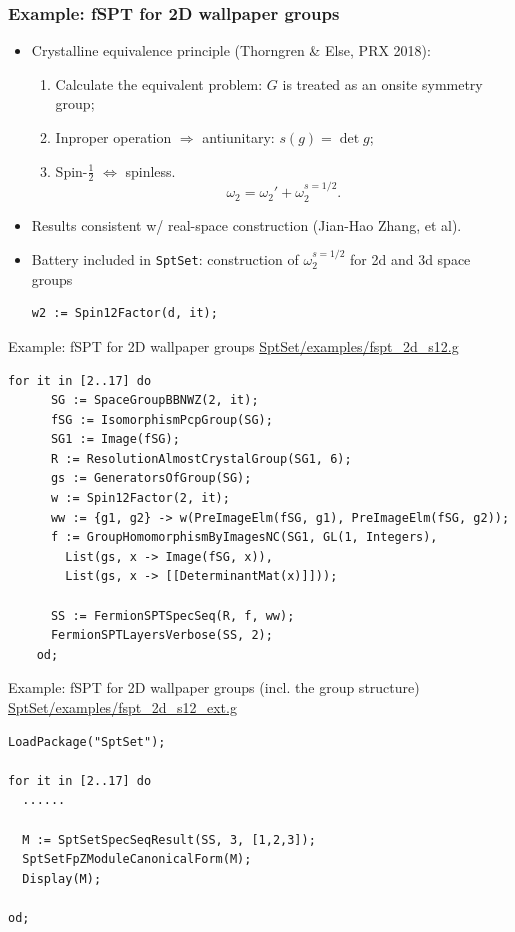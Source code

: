 \documentclass[xcolor=table, aspectratio=169]{beamer}
\begin{document}
\begin{frame}[fragile]
  \frametitle{Example: fSPT for 2D wallpaper groups}
  \begin{itemize}
  \item Crystalline equivalence principle (Thorngren \& Else, PRX 2018):
  \begin{enumerate}
	\item Calculate the equivalent problem: $G$ is treated as an \alert{onsite} symmetry group;
	\item Inproper operation $\Rightarrow$ antiunitary: $s(g) = \det g$;
	\item Spin-$\frac12$ $\Leftrightarrow$ spinless.
	\[\omega_2 = \omega_2' + \omega_2^{s=1/2}.\]
  \end{enumerate}
  \item Results consistent w/ real-space construction (Jian-Hao Zhang, et al).
  \item Battery included in \lstinline|SptSet|: construction of $\omega_2^{s=1/2}$ for 2d and 3d space groups
  \begin{lstlisting}[basicstyle=\footnotesize]
	w2 := Spin12Factor(d, it);
  \end{lstlisting}
\end{itemize}
\end{frame}

\begin{frame}[fragile]{Example: fSPT for 2D wallpaper groups}
	\url{SptSet/examples/fspt_2d_s12.g}
	\begin{lstlisting}[basicstyle=\footnotesize]
    for it in [2..17] do
      SG := SpaceGroupBBNWZ(2, it);
      fSG := IsomorphismPcpGroup(SG);
      SG1 := Image(fSG);
      R := ResolutionAlmostCrystalGroup(SG1, 6);
      gs := GeneratorsOfGroup(SG);
      w := Spin12Factor(2, it);
      ww := {g1, g2} -> w(PreImageElm(fSG, g1), PreImageElm(fSG, g2));
      f := GroupHomomorphismByImagesNC(SG1, GL(1, Integers),
        List(gs, x -> Image(fSG, x)),
        List(gs, x -> [[DeterminantMat(x)]]));

      SS := FermionSPTSpecSeq(R, f, ww);
      FermionSPTLayersVerbose(SS, 2);
    od;
  \end{lstlisting}
\end{frame}

\begin{frame}[fragile]{Example: fSPT for 2D wallpaper groups (incl. the group structure)}
	\url{SptSet/examples/fspt_2d_s12_ext.g}
	\begin{lstlisting}[basicstyle=\footnotesize]
LoadPackage("SptSet");

for it in [2..17] do
  ......

  M := SptSetSpecSeqResult(SS, 3, [1,2,3]);
  SptSetFpZModuleCanonicalForm(M);
  Display(M);

od;  \end{lstlisting}
\end{frame}
\end{document}

